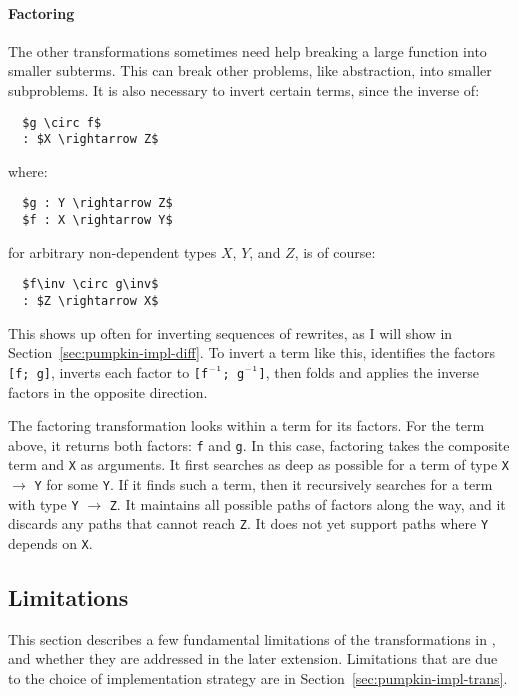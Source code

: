 \paragraph{Factoring} The other transformations sometimes need help breaking a large function into smaller subterms.
This can break other problems, like abstraction, into smaller subproblems.
It is also necessary to invert certain terms, since the inverse of:

\begin{lstlisting}
  $g \circ f$
  : $X \rightarrow Z$
\end{lstlisting}
where:

\begin{lstlisting}
  $g : Y \rightarrow Z$
  $f : X \rightarrow Y$
\end{lstlisting}
for arbitrary non-dependent types $X$, $Y$, and $Z$,
is of course:

\begin{lstlisting}
  $f\inv \circ g\inv$
  : $Z \rightarrow X$ 
\end{lstlisting}
This shows up often for inverting sequences of rewrites, as I will show in Section~\ref{sec:pumpkin-impl-diff}.
To invert a term like this, \sysname identifies the factors \lstinline{[f; g]}, 
inverts each factor to \lstinline{[f}$\inv$\lstinline{; g}$\inv$\lstinline{]}, 
then folds and applies the inverse factors in the opposite direction.

The factoring transformation looks within a term for its factors.
For the term above, it returns both factors: \lstinline{f} and \lstinline{g}.
In this case, factoring takes the composite term and \lstinline{X} as arguments.
It first searches as deep as possible for a term of type \lstinline{X} $\rightarrow$ \lstinline{Y} for some \lstinline{Y}.
If it finds such a term, then it recursively searches for a term with type \lstinline{Y} $\rightarrow$ \lstinline{Z}. 
It maintains all possible 
paths of factors along the way, and it discards any paths that cannot reach \lstinline{Z}.
It does not yet support paths where \lstinline{Y} depends on \lstinline{X}.

\subsection{Limitations}
\label{sec:pumpkin-trans-limitations}

This section describes a few fundamental limitations of the transformations in \sysname,
and whether they are addressed in the later \toolnamec extension.
Limitations that are due to the choice of implementation strategy are in Section~\ref{sec:pumpkin-impl-trans}.

